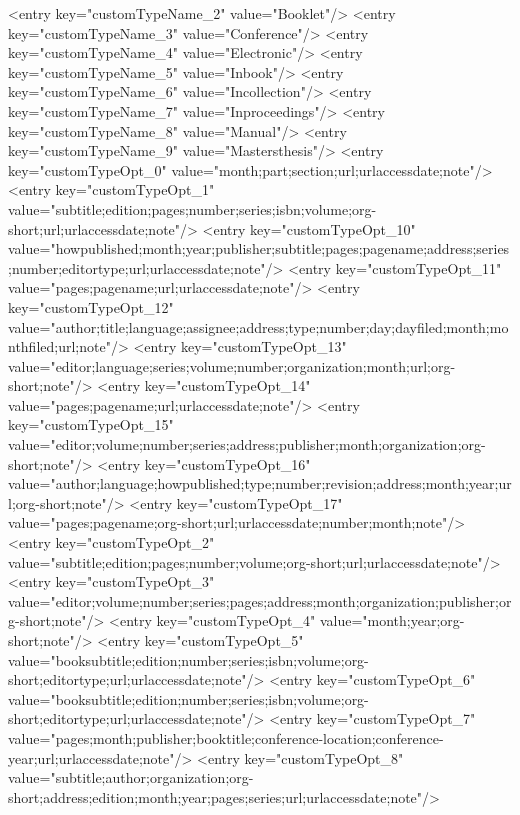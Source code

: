 \begin{codigo}[caption={Código de configuração do programa JabRef em XML}, label={codigo:config-jabref}, language=XML, breaklines=true]
            <entry key="customTypeName_2" value="Booklet"/>
            <entry key="customTypeName_3" value="Conference"/>
            <entry key="customTypeName_4" value="Electronic"/>
            <entry key="customTypeName_5" value="Inbook"/>
            <entry key="customTypeName_6" value="Incollection"/>
            <entry key="customTypeName_7" value="Inproceedings"/>
            <entry key="customTypeName_8" value="Manual"/>
            <entry key="customTypeName_9" value="Mastersthesis"/>
            <entry key="customTypeOpt_0" value="month;part;section;url;urlaccessdate;note"/>
            <entry key="customTypeOpt_1" value="subtitle;edition;pages;number;series;isbn;volume;org-short;url;urlaccessdate;note"/>
            <entry key="customTypeOpt_10" value="howpublished;month;year;publisher;subtitle;pages;pagename;address;series;number;editortype;url;urlaccessdate;note"/>
            <entry key="customTypeOpt_11" value="pages;pagename;url;urlaccessdate;note"/>
            <entry key="customTypeOpt_12" value="author;title;language;assignee;address;type;number;day;dayfiled;month;monthfiled;url;note"/>
            <entry key="customTypeOpt_13" value="editor;language;series;volume;number;organization;month;url;org-short;note"/>
            <entry key="customTypeOpt_14" value="pages;pagename;url;urlaccessdate;note"/>
            <entry key="customTypeOpt_15" value="editor;volume;number;series;address;publisher;month;organization;org-short;note"/>
            <entry key="customTypeOpt_16" value="author;language;howpublished;type;number;revision;address;month;year;url;org-short;note"/>
            <entry key="customTypeOpt_17" value="pages;pagename;org-short;url;urlaccessdate;number;month;note"/>
            <entry key="customTypeOpt_2" value="subtitle;edition;pages;number;volume;org-short;url;urlaccessdate;note"/>
            <entry key="customTypeOpt_3" value="editor;volume;number;series;pages;address;month;organization;publisher;org-short;note"/>
            <entry key="customTypeOpt_4" value="month;year;org-short;note"/>
            <entry key="customTypeOpt_5" value="booksubtitle;edition;number;series;isbn;volume;org-short;editortype;url;urlaccessdate;note"/>
            <entry key="customTypeOpt_6" value="booksubtitle;edition;number;series;isbn;volume;org-short;editortype;url;urlaccessdate;note"/>
            <entry key="customTypeOpt_7" value="pages;month;publisher;booktitle;conference-location;conference-year;url;urlaccessdate;note"/>
            <entry key="customTypeOpt_8" value="subtitle;author;organization;org-short;address;edition;month;year;pages;series;url;urlaccessdate;note"/>

\end{codigo}

